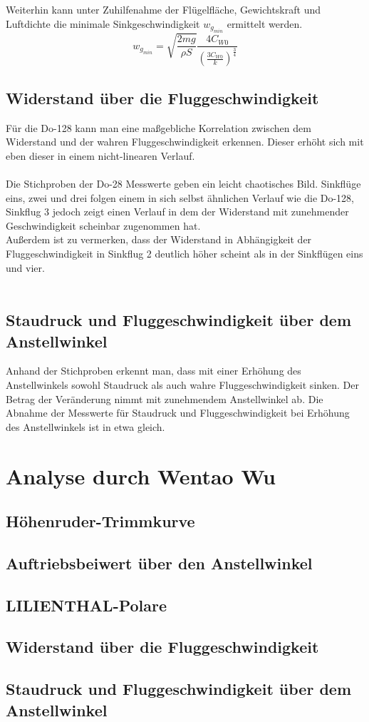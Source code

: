 \vspace{5mm}
\noindent Weiterhin kann unter Zuhilfenahme der Flügelfläche, Gewichtskraft und Luftdichte die minimale Sinkgeschwindigkeit $w_{g_{min}}$ ermittelt werden.\\

\begin{equation*}
w_{g_{min}} = \sqrt{\frac{2mg}{\rho S}} \frac{4C_{W0}}{\left( \frac{3C_{W0}}{k}\right)^{\frac{3}{4}}}
\end{equation*}

\vspace{10mm}
\subsection{Widerstand über die Fluggeschwindigkeit}
Für die Do-128 kann man eine maßgebliche Korrelation zwischen dem Widerstand und der wahren Fluggeschwindigkeit erkennen. Dieser erhöht sich mit eben dieser in einem  nicht-linearen Verlauf.\\\\
Die Stichproben der Do-28 Messwerte geben ein leicht chaotisches Bild. Sinkflüge eins, zwei und drei folgen einem in sich selbst ähnlichen Verlauf wie die Do-128, Sinkflug 3 jedoch zeigt einen Verlauf in dem der Widerstand mit zunehmender Geschwindigkeit scheinbar zugenommen hat.\\
Außerdem ist zu vermerken, dass der Widerstand in Abhängigkeit der Fluggeschwindigkeit in Sinkflug 2 deutlich höher scheint als in der Sinkflügen eins und vier.\\\\

\subsection{Staudruck und Fluggeschwindigkeit über dem Anstellwinkel}
Anhand der Stichproben erkennt man, dass mit einer Erhöhung des Anstellwinkels sowohl Staudruck als auch wahre Fluggeschwindigkeit sinken. Der Betrag der Veränderung nimmt mit zunehmendem Anstellwinkel ab. Die Abnahme der Messwerte für Staudruck und Fluggeschwindigkeit bei Erhöhung des Anstellwinkels ist in etwa gleich.
\newpage

\section{Analyse durch Wentao Wu}
\subsection{Höhenruder-Trimmkurve}
\subsection{Auftriebsbeiwert über den Anstellwinkel}
\subsection{LILIENTHAL-Polare}
\subsection{Widerstand über die Fluggeschwindigkeit}
\subsection{Staudruck und Fluggeschwindigkeit über dem Anstellwinkel}
\newpage
	
